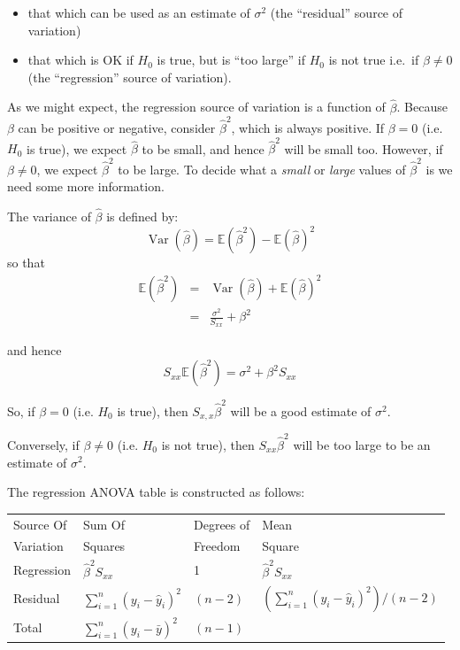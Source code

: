 \documentclass[12pt,a4paper,openany,twoside]{report}
\renewcommand{\emph}[1]{\textcolor{Emerald}{\textit{#1}}}
\theoremstyle{definition}
\theoremstyle{remark}
\theoremstyle{plain}
\newcommand{\vsps}{\vspace{.5cm}}
\newcommand{\E}{\mathbb{E}}
\newcommand{\Var}{\operatorname{Var}}
\theoremstyle{definition}
\theoremstyle{definition}
\theoremstyle{definition}
\theoremstyle{remark}
\begin{document}
\begin{itemize}
\item
  that which can be used as an estimate of \(\sigma^{2}\) (the
  ``residual'' source of variation)
\item
  that which is OK if \(H_{0}\) is true, but is ``too large'' if \(H_{0}\)
  is not true i.e.~if \(\beta \neq 0\) (the ``regression'' source of
  variation).
\end{itemize}

As we might expect, the regression source of variation is a function of
\(\hat{\beta}\). Because \(\beta\) can be positive or negative, consider
\({\hat{\beta}}^{2}\), which is always positive.
If \(\beta = 0\) (i.e. \(H_{0}\) is true), we expect \(\hat{\beta}\) to
be small, and hence \({\hat{\beta}}^{2}\) will be small too.
However, if \(\beta \neq 0\), we expect \({\hat{\beta}}^{2}\) to be
large. To decide what a \emph{small} or \emph{large} values of \({\hat{\beta}}^{2}\) is we need some more information.

The variance of \(\hat{\beta}\) is defined by:
\[\Var(\hat{\beta})= \E({\hat{\beta}}^{2}) - \E(\hat{\beta})^{2}\]
so that
\begin{eqnarray*}
\E({\hat{\beta}}^{2}) &=& \Var(\hat{\beta}) + {\E(\hat{\beta})}^{2}\\
& = & \frac{\sigma^{2}}{S_{xx}} +  \beta^{2}
\end{eqnarray*}

and hence
\[S_{xx} \E(\hat{\beta}^{2}) = \sigma^{2} + 
\beta^{2} S_{xx}\]

So, if \(\beta = 0\) (i.e. \(H_{0}\) is true), then
\(S_{x,x}{\hat{\beta}}^{2}\) will be a good estimate of
\(\sigma^{2}\).

Conversely, if \(\beta \neq 0\) (i.e. \(H_{0}\) is not true), then
\(S_{xx}{\hat{\beta}}^{2}\) will be too large to be an
estimate of \(\sigma^{2}\).

The regression ANOVA table is constructed as follows:\newline

\begin{longtable}[c]{@{}llll@{}}
\toprule
Source Of & Sum Of & Degrees of & Mean \\
Variation & Squares & Freedom & Square
\tabularnewline
\midrule
Regression &\({\hat{\beta}}^{2}S_{xx}\)  & 1 & \({\hat{\beta}}^{2}S_{xx}\) \\
Residual & \(\sum_{i = 1}^{n}{(y_{i} - {\hat{y}}_{i})}^{2}\) & \((n - 2)\) &  \((\sum_{i = 1}^{n}{(y_{i} - {\hat{y}}_{i})}^{2})/(n - 2)\)
\tabularnewline
Total &
\(\sum_{i = 1}^{n}{(y_{i} - \bar{y})}^{2}\) &
\((n - 1)\) & \tabularnewline
\bottomrule
\end{longtable}
\vsps
\end{document}
